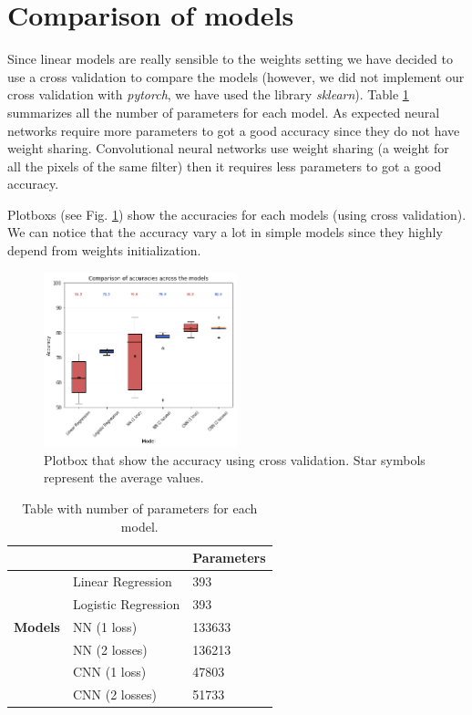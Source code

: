 \documentclass[journal, a4paper]{IEEEtran}
\begin{document}
\section{Comparison of models}
\label{sec:comparison}
Since linear models are really sensible to the weights setting 
we have decided to use a cross validation to compare the models (however, we did not implement our cross validation with \textit{pytorch}, we have used the library \textit{sklearn}).
Table \ref{table:params} summarizes all the number of parameters for each model. As expected neural networks require more parameters to got a good accuracy since they do not have weight sharing. Convolutional neural networks use weight sharing (a weight for all the pixels of the same filter) then it requires less parameters to got a good accuracy.

Plotboxs (see Fig. \ref{fig:train_acc_box}) show the accuracies for each models (using cross validation). We can notice that the accuracy vary a lot in simple models since they highly depend from weights initialization.

\begin{figure}[!h]
    \centering
    \includegraphics[width=0.5\textwidth]{boxplot.png}
    \caption{Plotbox that show the accuracy using cross validation. Star symbols represent the average values.}
    \label{fig:train_acc_box}
\end{figure}

\begin{table}
\centering
\caption{Table with number of parameters for each model.}
\label{table:params}
\begin{tabular}{|l|l|l|} 
\cline{3-3}
\multicolumn{1}{l}{} &                     & \textbf{Parameters}  \\ 
\cline{3-3}
\hline
                     & Linear Regression  & 393     \\ 
\cline{2-3}
               & Logistic Regression & 393     \\ 
\cline{2-3}
 \textbf{Models}   & NN (1 loss)~        & 133633  \\ 
\cline{2-3}
                     & NN (2 losses)~      &  136213  \\ 
\cline{2-3}
                     & CNN (1 loss)~       & 47803   \\ 
\cline{2-3}
                     & CNN (2 losses)     & 51733   \\
\hline
\end{tabular}
\end{table}
\end{document}
